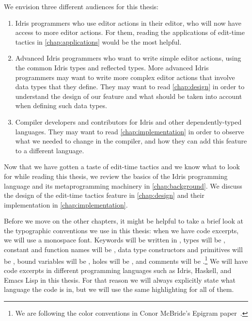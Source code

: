 We envision three different audiences for this thesis:
\begin{enumerate}[(1)]
\item Idris programmers who use editor actions in their editor, who will now
  have access to more editor actions. For them, reading the applications of
edit-time tactics in \autoref{chap:applications} would be the most helpful.
\item Advanced Idris programmers who want to write simple editor actions, using
  the common Idris types and reflected types. More advanced Idris programmers
    may want to write more complex editor actions that involve data types
    that they define.
    They may want to read \autoref{chap:design} in order to understand the
    design of our feature and what should be taken into account when defining
    such data types.
\item Compiler developers and contributors for Idris and other
  dependently-typed languages.  They may want to read
    \autoref{chap:implementation} in order to observe what we needed to change
    in the compiler, and how they can add this feature to a different language.
\end{enumerate}

Now that we have gotten a taste of edit-time tactics and we know what to look
for while reading this thesis, we review the basics of the Idris
programming language and its metaprogramming machinery in
\autoref{chap:background}.
We discuss the design of the edit-time tactics feature in
\autoref{chap:design} and their implementation in
\autoref{chap:implementation}.

Before we move on the other chapters, it might be helpful to take a brief look
at the typographic conventions we use in this thesis: when we have code
excerpts, we will use a monospace font.  Keywords will be written in , types will be , constant and function names will be
, data type constructors and primitives will be , bound
variables will be , holes will be
\texttt{}, and comments will be
.\footnote{We are following the color conventions in Conor McBride's
Epigram paper~\cite{epigram}.} We will have code excerpts in different
programming languages such as Idris, Haskell, and Emacs Lisp in this thesis.
For that reason we will always explicitly state what language the code is in,
but we will use the same highlighting for all of them.
